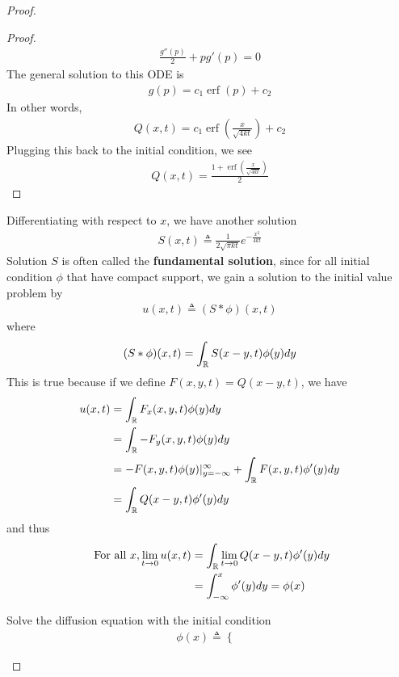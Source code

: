\documentclass{report}
\begin{document}
\begin{proof}
\begin{proof}
\begin{align*}
\frac{g''(p)}{2}+ pg'(p)=0
\end{align*}
The general solution to this ODE is 
\begin{align*}
g(p)=c_1\operatorname{erf}(p)+c_2
\end{align*}
In other words,
\begin{align*}
Q(x,t)=c_1 \operatorname{erf}(\frac{x}{\sqrt{4kt}})+ c_2
\end{align*}
Plugging this back to the initial condition, we see 
\begin{align*}
Q(x,t)= \frac{1+ \operatorname{erf}(\frac{x}{\sqrt{4kt} })}{2}
\end{align*}
\end{proof}
\begin{mdframed}
Differentiating  with respect to $x$, we have another solution
\begin{align*}
S(x,t)\triangleq  \frac{1}{2 \sqrt{\pi kt} }e^{- \frac{x^2}{4kt}}
\end{align*}
Solution $S$ is often called the \textbf{fundamental solution}, since for all initial condition $\phi$ that have compact support, we gain a solution to the initial value problem by 
\begin{align*}
u(x,t)\triangleq (S*\phi)(x,t)
\end{align*}
where 
\begin{align*}
  (S*\phi )(x,t)=\int_{\mathbb{R}} S(x-y,t)\phi (y)dy
\end{align*}
This is true because if we define $F(x,y,t)=Q(x-y,t)$, we have
\begin{align*}
u(x,t)&=\int_{\mathbb{R}} F_x(x,y,t)\phi (y)dy\\
&=\int_{\mathbb{R}} -F_y(x,y,t)\phi (y)dy\\
&= -F(x,y,t)\phi (y)|_{y=-\infty}^{\infty}+\int_{\mathbb{R}} F(x,y,t)\phi '(y)dy \\
&=\int_{\mathbb{R}} Q(x-y,t)\phi '(y)dy
\end{align*}
and thus 
\begin{align*}
\text{ For all }x,\lim_{t\to 0}u(x,t)&=\int_{\mathbb{R}} \lim_{t\to 0}Q(x-y,t)\phi '(y)dy \\
&= \int_{-\infty}^x \phi '(y) dy =\phi (x)
\end{align*}
\end{mdframed}
\begin{question}{}{}
Solve the diffusion equation with the initial condition 
\begin{align*}
\phi (x)\triangleq \begin{cases}

\end{cases}
\end{align*}
\end{question}
\end{proof}
\end{document}

